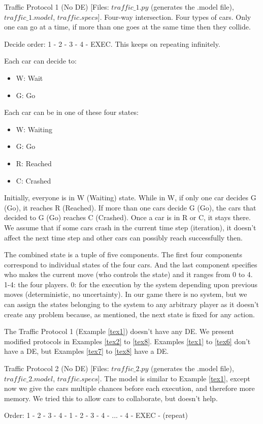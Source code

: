 \documentclass[format=acmsmall, review=false]{acmart}
\begin{document}
\begin{example}\label{tex1}
Traffic Protocol 1 (No DE) [Files: $traffic\_1.py$ (generates the .model file), $traffic\_1.model$, $traffic.specs$]. Four-way intersection. Four types of cars. Only one can go at a time, if more than one goes at the same time then they collide.

Decide order: 1 - 2 - 3 - 4 - EXEC. This keeps on repeating infinitely.

Each car can decide to:
\begin{itemize}
\item W: Wait
\item G: Go
\end{itemize}

Each car can be in one of these four states:
\begin{itemize}
\item W: Waiting
\item G: Go
\item R: Reached
\item C: Crashed
\end{itemize}

Initially, everyone is in W (Waiting) state. While in W, if only one car decides G (Go), it reaches R (Reached). If more than one cars decide G (Go), the cars that decided to G (Go) reaches C (Crashed). Once a car is in R or C, it stays there. We assume that if some cars crash in the current time step (iteration), it doesn't affect the next time step and other cars can possibly reach successfully then.

The combined state is a tuple of five components. The first four components correspond to individual states of the four cars. And the last component specifies who makes the current move (who controls the state) and it ranges from 0 to 4. 1-4: the four players. 0: for the execution by the system depending upon previous moves (deterministic, no uncertainty). In our game there is no system, but we can assign the states belonging to the system to any arbitrary player as it doesn't create any problem because, as mentioned, the next state is fixed for any action.
\end{example}

The Traffic Protocol 1 (Example \ref{tex1}) doesn't have any DE. We present modified protocols in Examples \ref{tex2} to \ref{tex8}. Examples \ref{tex1} to \ref{tex6} don't have a DE, but Examples \ref{tex7} to \ref{tex8} have a DE.

\begin{example}\label{tex2}
Traffic Protocol 2 (No DE) [Files: $traffic\_2.py$ (generates the .model file), $traffic\_2.model$, $traffic.specs$]. The model is similar to Example \ref{tex1}, except now we give the cars multiple chances before each execution, and therefore more memory. We tried this to allow cars to collaborate, but doesn't help.

Order: 1 - 2 - 3 - 4 - 1 - 2 - 3 - 4 - ... - 4 - EXEC - (repeat)
\end{example}
\end{document}
